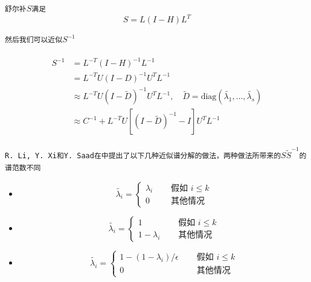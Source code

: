 \documentclass[11pt, a4paper]{article}
\theoremstyle{plain}
\theoremstyle{plain}
\theoremstyle{plain}
\theoremstyle{definition}
\theoremstyle{remark}
\theoremstyle{definition}
\newcommand{\T}[1]{\texttt{#1}}
\begin{document}
\T{舒尔补$S$满足} 
\begin{equation}
	S = L(I - H)L^T
\end{equation}

\T{然后我们可以近似$S^{-1}$\cite{SLR}}	

\begin{gather}
	\begin{aligned}
		S^{-1} &= L^{-T} (I - H)^{-1}L^{-1} \\ &= L^{-T} U (I - D)^{-1} U^T L^{-1} \\
		&\approx L^{-T} U (I - \tilde{D})^{-1} U^T L^{-1} ,\quad \tilde{D} = \text{diag}(\tilde{\lambda_1}, \ldots, \tilde{\lambda_s}) \\
		&\approx C^{-1} + L^{-T} U[(I - \tilde{D})^{-1} - I]U^TL^{-1}
	\end{aligned}
\end{gather}

\T{R. Li, Y. Xi和Y. Saad在\cite{SLR}中提出了以下几种近似谱分解的做法，两种做法所带来的$S \tilde{S}^{-1}$的谱范数不同}
\begin{multicols}{2}
	\begin{itemize}
		\item
		\begin{equation}
			\nonumber
			\tilde{\lambda_i} = \begin{cases}
				\lambda_i \quad &\T{ 假如 } i \leq k \\
				0 \quad &\T{ 其他情况}
			\end{cases}
		\end{equation}
		
		\item
		\begin{equation}
			\nonumber
			\tilde{\lambda_i} = \begin{cases}
				1 \quad & \T{ 假如 } i \leq k \\
				1 - \lambda_i \quad & \T{ 其他情况}
			\end{cases}
		\end{equation}
		
		\item
		\begin{equation}
			\nonumber
			\tilde{\lambda_i} = \begin{cases}
				1 - (1 - \lambda_i) / \epsilon \quad & \T{ 假如 } i \leq k \\
				0 \quad & \T{ 其他情况}
			\end{cases}
		\end{equation}
	\end{itemize}
\end{multicols}
\end{document}
